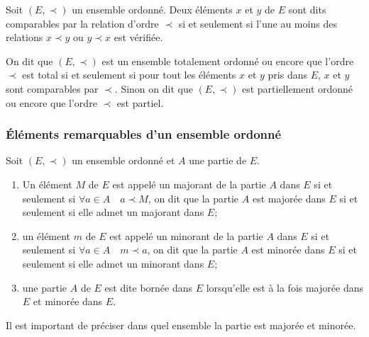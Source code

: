 \begin{defdef}
    Soit \((E, \prec)\) un ensemble ordonné. Deux éléments \(x\) et \(y\) de 
    \(E\) sont dits comparables par la relation d'ordre \(\prec\) si et 
    seulement si l'une au moins des relations \(x \prec y\) ou \(y \prec x\) est 
    vérifiée.
\end{defdef}

\begin{defdef}
    On dit que \((E, \prec)\) est un ensemble totalement ordonné ou encore que 
    l'ordre \(\prec\) est total si et seulement si pour tout les éléments \(x\) 
    et \(y\) pris dans \(E\), \(x\) et \(y\) sont comparables par \(\prec\). 
    Sinon on dit que \((E, \prec)\) est partiellement ordonné ou encore que 
    l'ordre \(\prec\) est partiel.
\end{defdef}

\subsubsection{Éléments remarquables d'un ensemble ordonné}
\label{chap3-subsubsec:elementremarquables}

Soit \((E,\prec)\) un ensemble ordonné et \(A\) une partie de \(E\).
\begin{defdef}
    \begin{enumerate}
        \item Un élément \(M\) de \(E\) est appelé un majorant de la partie 
            \(A\) dans \(E\) si et seulement si \(\forall a \in A \quad a \prec 
            M\), on dit que la partie \(A\) est majorée dans \(E\) si et 
            seulement si elle admet un majorant dans \(E\);
        \item un élément \(m\) de \(E\) est appelé un minorant de la partie 
            \(A\) dans \(E\) si et seulement si \(\forall a \in A \quad m \prec 
            a\), on dit que la partie \(A\) est minorée dans \(E\) si et 
            seulement si elle admet un minorant dans \(E\);
        \item une partie \(A\) de \(E\) est dite bornée dans \(E\) lorsqu'elle 
            est à la fois majorée dans \(E\) et minorée dans \(E\).
    \end{enumerate}
    Il est important de préciser dans quel ensemble la partie est majorée et 
    minorée.
\end{defdef}

